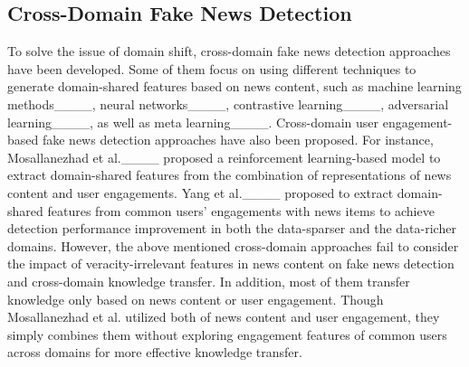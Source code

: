 \subsection{Cross-Domain Fake News Detection}
To solve the issue of domain shift, cross-domain fake news detection approaches have been developed. Some of them focus on using different techniques to generate domain-shared features based on news content, such as machine learning methods____, neural networks____, contrastive learning____, adversarial learning____, as well as meta learning____. Cross-domain user engagement-based fake news detection approaches have also been proposed. For instance, Mosallanezhad et al.____ proposed a reinforcement learning-based model to extract domain-shared features from the combination of representations of news content and user engagements. Yang et al.____ proposed to extract domain-shared features from common users' engagements with news items to achieve detection performance improvement in both the data-sparser and the data-richer domains. However, the above mentioned cross-domain approaches fail to consider the impact of veracity-irrelevant features in news content on fake news detection and cross-domain knowledge transfer. In addition, most of them transfer knowledge only based on news content or user engagement. Though Mosallanezhad et al. utilized both of  news content and user engagement, they simply combines them without exploring engagement features of common users across domains for more effective knowledge transfer.